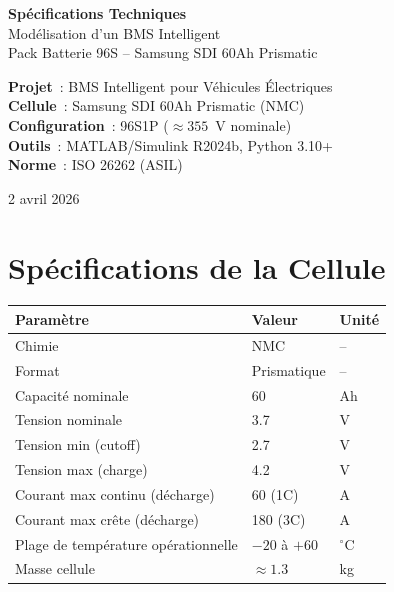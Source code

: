 \documentclass[a4paper,11pt]{article}
\begin{document}
\begin{titlepage}
\centering
\vspace*{2cm}
{\LARGE\bfseries\textcolor{bmsprimary}{Spécifications Techniques}}\\[0.4cm]
{\Large\textcolor{bmssecondary}{Modélisation d'un BMS Intelligent}}\\[0.3cm]
{\large\textcolor{bmssecondary}{Pack Batterie 96S -- Samsung SDI 60Ah Prismatic}}\\[1.5cm]

\begin{tcolorbox}[colback=bmslight, colframe=bmsprimary, width=13cm]
\centering
\textbf{Projet}~: BMS Intelligent pour Véhicules Électriques\\[4pt]
\textbf{Cellule}~: Samsung SDI 60Ah Prismatic (NMC)\\[4pt]
\textbf{Configuration}~: 96S1P ($\approx 355$~V nominale)\\[4pt]
\textbf{Outils}~: MATLAB/Simulink R2024b, Python 3.10+\\[4pt]
\textbf{Norme}~: ISO 26262 (ASIL)
\end{tcolorbox}

\vfill
{\large\textcolor{bmsgray}{2 avril 2026}}
\end{titlepage}

\tableofcontents
\newpage

\section{Spécifications de la Cellule}

\begin{center}
\renewcommand{\arraystretch}{1.4}
\begin{tabular}{p{5.5cm} p{3.5cm} p{3cm}}
\toprule
\textbf{Paramètre} & \textbf{Valeur} & \textbf{Unité} \\
\midrule
Chimie & NMC & -- \\
Format & Prismatique & -- \\
Capacité nominale & 60 & Ah \\
Tension nominale & 3.7 & V \\
Tension min (cutoff) & 2.7 & V \\
Tension max (charge) & 4.2 & V \\
Courant max continu (décharge) & 60 (1C) & A \\
Courant max crête (décharge) & 180 (3C) & A \\
Plage de température opérationnelle & $-20$ à $+60$ & $^\circ$C \\
Masse cellule & $\approx 1.3$ & kg \\
\bottomrule
\end{tabular}
\end{center}
\end{document}
